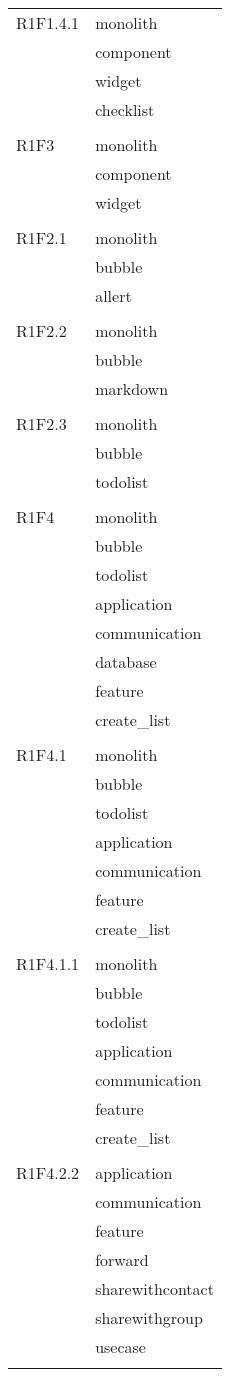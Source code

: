 \begin{center}
\begin{longtable}{|p{7cm}|p{5cm}|}
		R1F1.4.1 & monolith \\ & component \\ & widget \\ & checklist \\ & \\ \hline
		R1F3 & monolith \\ & component \\ & widget \\ & \\ \hline
		R1F2.1 & monolith \\ & bubble \\ & allert \\ & \\ \hline
		R1F2.2 & monolith \\ & bubble \\ & markdown \\ & \\ \hline
		R1F2.3 & monolith \\ & bubble \\ & todolist \\ & \\ \hline
		R1F4 & monolith \\ & bubble \\ & todolist \\ & application \\ & communication \\ & database \\ & feature \\ & create\_list \\ & \\ \hline
		R1F4.1 & monolith \\ & bubble \\ & todolist \\ & application \\ & communication \\ & feature \\ & create\_list \\ & \\ \hline
		R1F4.1.1 & monolith \\ & bubble \\ & todolist \\ & application \\ & communication \\ & feature \\ & create\_list \\ & \\ \hline
		R1F4.2.2 & application \\ & communication \\ & feature \\ & forward \\ & sharewithcontact \\ & sharewithgroup \\ & usecase \\ & \\ \hline

\end{longtable}
\end{center}
